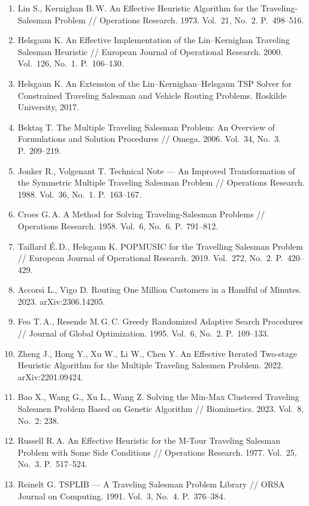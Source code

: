 \documentclass[14pt,a4paper]{extarticle}
\begin{document}
\begin{enumerate}
  \item Lin S., Kernighan B.\,W. An Effective Heuristic Algorithm for the Traveling-Salesman Problem // Operations Research. 1973. Vol.~21, No.~2. P.~498--516.
  \item Helsgaun K. An Effective Implementation of the Lin--Kernighan Traveling Salesman Heuristic // European Journal of Operational Research. 2000. Vol.~126, No.~1. P.~106--130.
  \item Helsgaun K. An Extension of the Lin--Kernighan--Helsgaun TSP Solver for Constrained Traveling Salesman and Vehicle Routing Problems. Roskilde University, 2017.
  \item Bektaş T. The Multiple Traveling Salesman Problem: An Overview of Formulations and Solution Procedures // Omega. 2006. Vol.~34, No.~3. P.~209--219.
  \item Jonker R., Volgenant T. Technical Note --- An Improved Transformation of the Symmetric Multiple Traveling Salesman Problem // Operations Research. 1988. Vol.~36, No.~1. P.~163--167.
  \item Croes G.\,A. A Method for Solving Traveling-Salesman Problems // Operations Research. 1958. Vol.~6, No.~6. P.~791--812.
  \item Taillard É.\,D., Helsgaun K. POPMUSIC for the Travelling Salesman Problem // European Journal of Operational Research. 2019. Vol.~272, No.~2. P.~420--429.
  \item Accorsi L., Vigo D. Routing One Million Customers in a Handful of Minutes. 2023. arXiv:2306.14205.
  \item Feo T.\,A., Resende M.\,G.\,C. Greedy Randomized Adaptive Search Procedures // Journal of Global Optimization. 1995. Vol.~6, No.~2. P.~109--133.
  \item Zheng J., Hong Y., Xu W., Li W., Chen Y. An Effective Iterated Two-stage Heuristic Algorithm for the Multiple Traveling Salesmen Problem. 2022. arXiv:2201.09424.
  \item Bao X., Wang G., Xu L., Wang Z. Solving the Min-Max Clustered Traveling Salesmen Problem Based on Genetic Algorithm // Biomimetics. 2023. Vol.~8, No.~2: 238.
  \item Russell R.\,A. An Effective Heuristic for the M-Tour Traveling Salesman Problem with Some Side Conditions // Operations Research. 1977. Vol.~25, No.~3. P.~517--524.
  \item Reinelt G. TSPLIB --- A Traveling Salesman Problem Library // ORSA Journal on Computing. 1991. Vol.~3, No.~4. P.~376--384.

\end{enumerate}
\end{document}
